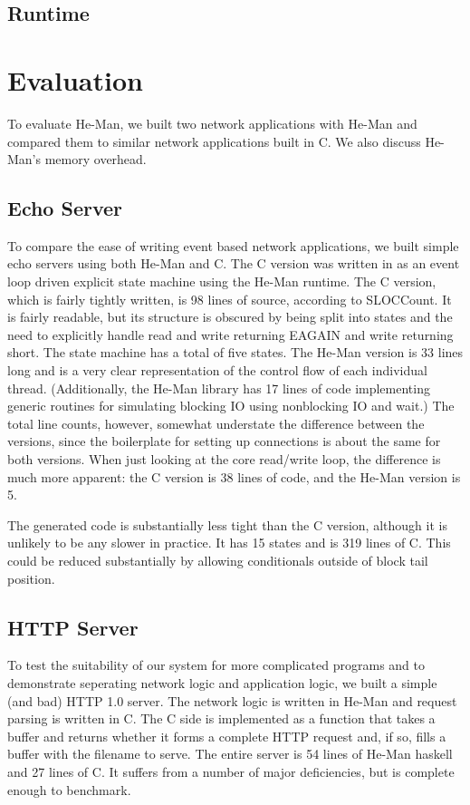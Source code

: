 \documentclass[preprint,11pt]{sigplanconf}
\begin{document}
\subsection{Runtime}

\section{Evaluation}

To evaluate He-Man, we built two network applications with He-Man and
compared them to similar network applications built in C.
We also discuss He-Man's memory overhead.

\subsection{Echo Server}

To compare the ease of writing event based network applications, we
built simple echo servers using both He-Man and C. The C version was
written in as an event loop driven explicit state machine using the
He-Man runtime. The C version, which is fairly tightly written, is 98
lines of source, according to SLOCCount. It is fairly readable, but
its structure is obscured by being split into states and the need to
explicitly handle read and write returning EAGAIN and write returning
short. The state machine has a total of five states. The He-Man
version is 33 lines long and is a very clear representation of the
control flow of each individual thread. (Additionally, the He-Man
library has 17 lines of code implementing generic routines for
simulating blocking IO using nonblocking IO and wait.) The total line
counts, however, somewhat understate the difference between the
versions, since the boilerplate for setting up connections is about
the same for both versions. When just looking at the core read/write
loop, the difference is much more apparent: the C version is 38 lines
of code, and the He-Man version is 5.

The generated code is substantially less tight than the C version,
although it is unlikely to be any slower in practice. It has 15 states
and is 319 lines of C. This could be reduced substantially by allowing
conditionals outside of block tail position.

\subsection{HTTP Server}

To test the suitability of our system for more complicated programs
and to demonstrate seperating network logic and application logic, we
built a simple (and bad) HTTP 1.0 server. The network logic is written
in He-Man and request parsing is written in C. The C side is
implemented as a function that takes a buffer and returns whether it
forms a complete HTTP request and, if so, fills a buffer with the
filename to serve. The entire server is 54 lines of He-Man haskell and
27 lines of C. It suffers from a number of major deficiencies, but is
complete enough to benchmark.
\end{document}
